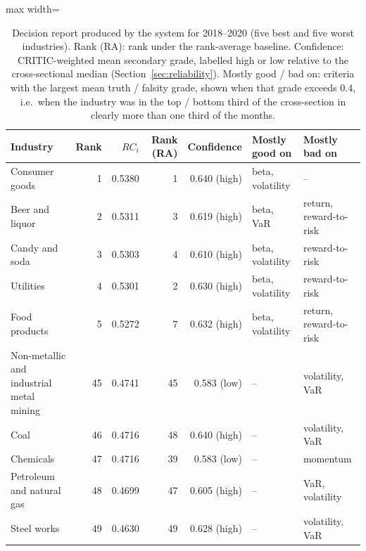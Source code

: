 \begin{table}[!htbp]
\centering
\scriptsize
\caption{Decision report produced by the system for 2018--2020 (five best and five worst industries). Rank (RA): rank under the rank-average baseline. Confidence: CRITIC-weighted mean secondary grade, labelled high or low relative to the cross-sectional median (Section~\ref{sec:reliability}). Mostly good / bad on: criteria with the largest mean truth / falsity grade, shown when that grade exceeds 0.4, i.e.\ when the industry was in the top / bottom third of the cross-section in clearly more than one third of the months.}\label{tab:report}
\begin{adjustbox}{max width=\textwidth}
\begin{tabular}{lrrrrll}
\toprule
Industry & Rank & $RC_i$ & Rank (RA) & Confidence & Mostly good on & Mostly bad on \\
\midrule
Consumer goods & 1 & 0.5380 & 1 & 0.640 (high) & beta, volatility & -- \\
Beer and liquor & 2 & 0.5311 & 3 & 0.619 (high) & beta, VaR & return, reward-to-risk \\
Candy and soda & 3 & 0.5303 & 4 & 0.610 (high) & beta, volatility & reward-to-risk \\
Utilities & 4 & 0.5301 & 2 & 0.630 (high) & beta, volatility & reward-to-risk \\
Food products & 5 & 0.5272 & 7 & 0.632 (high) & beta, volatility & return, reward-to-risk \\
\midrule
Non-metallic and industrial metal mining & 45 & 0.4741 & 45 & 0.583 (low) & -- & volatility, VaR \\
Coal & 46 & 0.4716 & 48 & 0.640 (high) & -- & volatility, VaR \\
Chemicals & 47 & 0.4716 & 39 & 0.583 (low) & -- & momentum \\
Petroleum and natural gas & 48 & 0.4699 & 47 & 0.605 (high) & -- & VaR, volatility \\
Steel works & 49 & 0.4630 & 49 & 0.628 (high) & -- & volatility, VaR \\
\bottomrule
\end{tabular}
\end{adjustbox}
\end{table}
